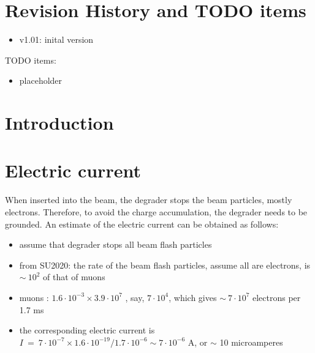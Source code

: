 \documentclass[12pt]{article}
\begin{document}
% 


\newpage
\section {Revision History and TODO items}

\begin{itemize}
\item
  v1.01: inital version
\end{itemize}

TODO items:

\begin{itemize}
\item
  placeholder
\end{itemize}

\newpage
\section {Introduction}





\section{Electric current}
When inserted into the beam, the degrader stops the beam particles, mostly electrons.
Therefore, to avoid the charge accumulation, the degrader needs to be grounded.
An estimate of the electric current can be obtained as follows:
\begin{itemize}
\item
  assume that degrader stops all beam flash particles
\item
  from SU2020: the rate of the beam flash particles, assume all are electrons, is $\sim ~ 10^2$ of that of muons
\item
  muons : $1.6 \cdot 10^{-3} \times 3.9 \cdot 10^7$ , say, $7 \cdot 10^4$, which gives $\sim ~ 7 \cdot 10^7$ electrons per 1.7 ms
\item
  the corresponding electric current is $I ~=~ 7 \cdot 10^{-7} \times 1.6 \cdot 10^{-19} / {1.7 \cdot 10^{-6}} \sim 7 \cdot 10^{-6}$ A,
  or $\sim$ 10 microamperes
\end{itemize}
\end{document}
